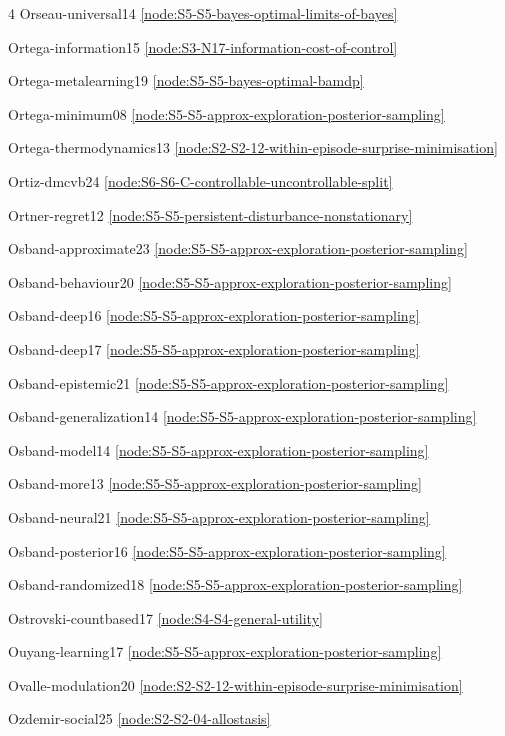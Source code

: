\documentclass[10pt]{article}
\begin{document}
{\begin{multicols}{4}
Orseau-universal14 \hfill \ref{node:S5-S5-bayes-optimal-limits-of-bayes}\par
Ortega-information15 \hfill \ref{node:S3-N17-information-cost-of-control}\par
Ortega-metalearning19 \hfill \ref{node:S5-S5-bayes-optimal-bamdp}\par
Ortega-minimum08 \hfill \ref{node:S5-S5-approx-exploration-posterior-sampling}\par
Ortega-thermodynamics13 \hfill \ref{node:S2-S2-12-within-episode-surprise-minimisation}\par
Ortiz-dmcvb24 \hfill \ref{node:S6-S6-C-controllable-uncontrollable-split}\par
Ortner-regret12 \hfill \ref{node:S5-S5-persistent-disturbance-nonstationary}\par
Osband-approximate23 \hfill \ref{node:S5-S5-approx-exploration-posterior-sampling}\par
Osband-behaviour20 \hfill \ref{node:S5-S5-approx-exploration-posterior-sampling}\par
Osband-deep16 \hfill \ref{node:S5-S5-approx-exploration-posterior-sampling}\par
Osband-deep17 \hfill \ref{node:S5-S5-approx-exploration-posterior-sampling}\par
Osband-epistemic21 \hfill \ref{node:S5-S5-approx-exploration-posterior-sampling}\par
Osband-generalization14 \hfill \ref{node:S5-S5-approx-exploration-posterior-sampling}\par
Osband-model14 \hfill \ref{node:S5-S5-approx-exploration-posterior-sampling}\par
Osband-more13 \hfill \ref{node:S5-S5-approx-exploration-posterior-sampling}\par
Osband-neural21 \hfill \ref{node:S5-S5-approx-exploration-posterior-sampling}\par
Osband-posterior16 \hfill \ref{node:S5-S5-approx-exploration-posterior-sampling}\par
Osband-randomized18 \hfill \ref{node:S5-S5-approx-exploration-posterior-sampling}\par
Ostrovski-countbased17 \hfill \ref{node:S4-S4-general-utility}\par
Ouyang-learning17 \hfill \ref{node:S5-S5-approx-exploration-posterior-sampling}\par
Ovalle-modulation20 \hfill \ref{node:S2-S2-12-within-episode-surprise-minimisation}\par
Ozdemir-social25 \hfill \ref{node:S2-S2-04-allostasis}\par


\end{multicols}}
\end{document}
